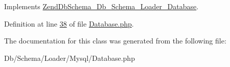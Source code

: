 Implements \hyperlink{interfaceZendDbSchema__Db__Schema__Loader__Database_a10f75b5851a988ef075a6f3eea49b581}{Zend\-Db\-Schema\-\_\-\-Db\-\_\-\-Schema\-\_\-\-Loader\-\_\-\-Database}.



Definition at line \hyperlink{Loader_2Mysql_2Database_8php_source_l00038}{38} of file \hyperlink{Loader_2Mysql_2Database_8php_source}{Database.\-php}.



The documentation for this class was generated from the following file\-:\begin{DoxyCompactItemize}
\item 
Db/\-Schema/\-Loader/\-Mysql/Database.\-php\end{DoxyCompactItemize}
